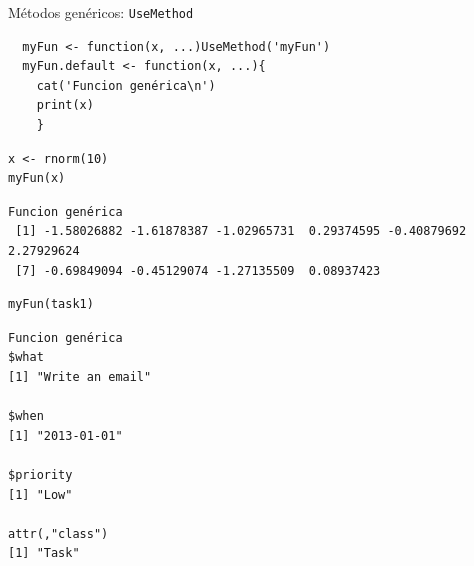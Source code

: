 \documentclass[xcolor={usenames,svgnames,dvipsnames}]{beamer}
\begin{document}
\begin{frame}[fragile,label={sec:orgad0f6e4}]{Métodos genéricos: \texttt{UseMethod}}
 \lstset{language=r,label= ,caption= ,captionpos=b,numbers=none}
\begin{lstlisting}
  myFun <- function(x, ...)UseMethod('myFun')
  myFun.default <- function(x, ...){
    cat('Funcion genérica\n')
    print(x)
    }
\end{lstlisting}

\lstset{language=r,label= ,caption= ,captionpos=b,numbers=none}
\begin{lstlisting}
x <- rnorm(10)
myFun(x)
\end{lstlisting}

\begin{verbatim}
Funcion genérica
 [1] -1.58026882 -1.61878387 -1.02965731  0.29374595 -0.40879692  2.27929624
 [7] -0.69849094 -0.45129074 -1.27135509  0.08937423
\end{verbatim}

\lstset{language=r,label= ,caption= ,captionpos=b,numbers=none}
\begin{lstlisting}
myFun(task1)
\end{lstlisting}

\begin{verbatim}
Funcion genérica
$what
[1] "Write an email"

$when
[1] "2013-01-01"

$priority
[1] "Low"

attr(,"class")
[1] "Task"
\end{verbatim}
\end{frame}
\end{document}
